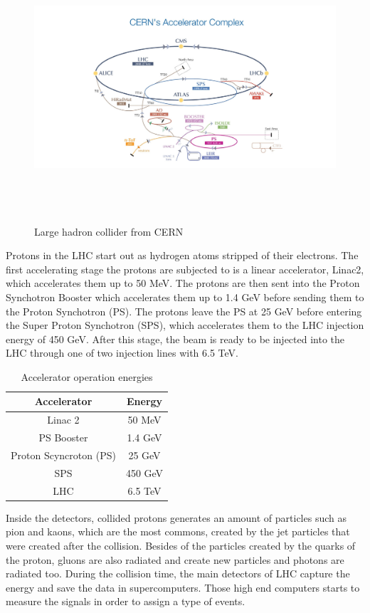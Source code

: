 \begin{figure}[ht]
\centering
\includegraphics[width=16cm,height=10cm]{Chapter1/cern.jpg}
\caption[Large hadron collider from CERN]{Large hadron collider from CERN\cite{cern1}} \label{lhc}
\end{figure}


Protons in the LHC start out as hydrogen atoms stripped of their electrons. The first accelerating stage the protons are subjected to is a linear accelerator, Linac2,
which accelerates them up to 50 MeV. The protons are then sent into the
Proton Synchotron Booster which accelerates them up to 1.4 GeV before sending them to the Proton Synchotron (PS). The protons leave the PS at 25 GeV before entering the Super Proton Synchotron (SPS), which accelerates them to the LHC injection energy of 450 GeV. After this stage, the beam is ready to be injected into
the LHC through one of two injection lines with 6.5 TeV.\cite{cern3}

\begin{table}[ht]
\centering
	\caption[Accelerator operation energies]{Accelerator operation energies\cite{cern3,cern1}}
	\begin{tabular}{|c|c|}
		\hline
		Accelerator & Energy \\
		\hline
		Linac 2 & 50 MeV \\
		\hline
		PS Booster & 1.4 GeV \\
		\hline
		Proton Scyncroton (PS) & 25 GeV\\
		\hline
		SPS & 450 GeV\\
		\hline
		LHC & 6.5 TeV\\
		\hline
	\end{tabular}
\end{table}
\pagebreak
Inside the detectors, collided protons generates an amount of particles such as pion and kaons, which are the most commons, created by the jet particles that were created after the collision. Besides of the particles created by the quarks of the proton, gluons are also radiated and create new particles and photons are radiated too. 
During the collision time, the main detectors of LHC capture the energy 
and save the data in supercomputers. Those high end computers starts to measure the signals in order to assign a type of events.


